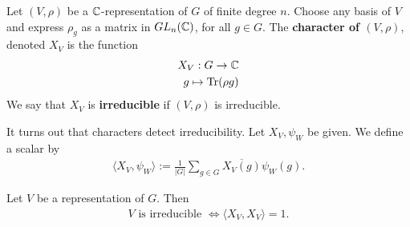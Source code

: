 \documentclass{memoir}
\begin{document}
\begin{defn}
	Let \((V,\rho)\) be a \(\mathbb{C}\)-representation of \(G\) of finite degree \(n\). Choose any basis of \(V\) and express \(\rho_g\) as a matrix in \(GL_n(\mathbb{C})\), for all \(g \in G\). The \textbf{character of \((V,\rho)\)}, denoted \(X_V\) is the function
	\begin{align*}
		X_V:G\to \mathbb{C}\\
		g\mapsto \textrm{Tr}(\rho g)
	\end{align*}
	We say that \(X_V\) is \textbf{irreducible} if \((V,\rho)\) is irreducible.
\end{defn}
It turns out that characters detect irreducibility. Let \(X_V,\psi_W\) be given. We define a scalar by
\begin{align*}
	\langle X_V,\psi_W \rangle := \frac{1}{\left| G \right| }\sum_{g \in G} \overline{X_V(g)}\psi_W(g).
\end{align*}
\begin{prop}
	Let \(V\) be a representation of \(G\). Then
	\begin{align*}
		V \text{ is irreducible }\iff\langle X_V,X_V \rangle =1.
	\end{align*}
\end{prop}
\end{document}
